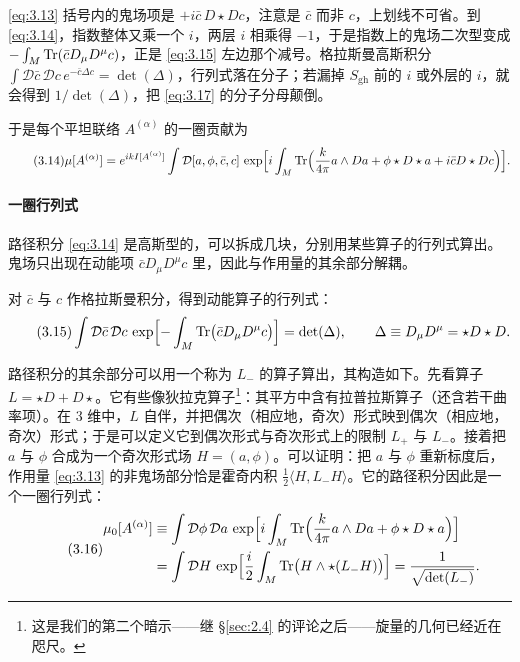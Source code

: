 \begin{yizhu}[易错点]
\eqref{eq:3.13} 括号内的鬼场项是 $+i\bar c\,D\star Dc$，注意是 $\bar c$ 而非 $c$，上划线不可省。到 \eqref{eq:3.14}，指数整体又乘一个 $i$，两层 $i$ 相乘得 $-1$，于是指数上的鬼场二次型变成 $-\int_M\operatorname{Tr}(\bar c D_\mu D^\mu c)$，正是 \eqref{eq:3.15} 左边那个减号。格拉斯曼高斯积分 $\int\mathcal{D}\bar c\,\mathcal{D}c\,e^{-\bar c\Delta c}=\det(\Delta)$，行列式落在分子；若漏掉 $S_{\mathrm{gh}}$ 前的 $i$ 或外层的 $i$，就会得到 $1/\det(\Delta)$，把 \eqref{eq:3.17} 的分子分母颠倒。
\end{yizhu}

于是每个平坦联络 $A^{(\alpha)}$ 的一圈贡献为
\begin{equation}\tag{3.14}\label{eq:3.14}
  \mu[A^{(\alpha)}] = e^{ikI[A^{(\alpha)}]}\int\mathcal{D}[a,\phi,\bar c,c]\,\exp\Bigl[i\int_M\operatorname{Tr}\Bigl(\frac{k}{4\pi}a\wedge Da + \phi\star D\star a + i\bar c D\star D c\Bigr)\Bigr].
\end{equation}

\paragraph{一圈行列式}
路径积分 \eqref{eq:3.14} 是高斯型的，可以拆成几块，分别用某些算子的行列式算出。鬼场只出现在动能项 $\bar c D_\mu D^\mu c$ 里，因此与作用量的其余部分解耦。

对 $\bar c$ 与 $c$ 作格拉斯曼积分，得到动能算子的行列式：
\begin{equation}\tag{3.15}\label{eq:3.15}
  \int\mathcal{D}\bar c\,\mathcal{D}c\,\exp\Bigl[-\int_M\operatorname{Tr}\bigl(\bar c D_\mu D^\mu c\bigr)\Bigr] = \det(\Delta),
  \qquad \Delta\equiv D_\mu D^\mu = \star D\star D.
\end{equation}

路径积分的其余部分可以用一个称为 $L_-$ 的算子算出，其构造如下。先看算子 $L=\star D+D\star$。它有些像狄拉克算子\footnote{这是我们的第二个暗示——继 \S\ref{sec:2.4} 的评论之后——旋量的几何已经近在咫尺。}：其平方中含有拉普拉斯算子（还含若干曲率项）。在 3 维中，$L$ 自伴，并把偶次（相应地，奇次）形式映到偶次（相应地，奇次）形式；于是可以定义它到偶次形式与奇次形式上的限制 $L_+$ 与 $L_-$。接着把 $a$ 与 $\phi$ 合成为一个奇次形式场 $H=(a,\phi)$。可以证明：把 $a$ 与 $\phi$ 重新标度后，作用量 \eqref{eq:3.13} 的非鬼场部分恰是霍奇内积 $\frac12\langle H,L_-H\rangle$。它的路径积分因此是一个一圈行列式：
\begin{equation}\tag{3.16}\label{eq:3.16}
\begin{aligned}
  \mu_0[A^{(\alpha)}] &\equiv \int\mathcal{D}\phi\,\mathcal{D}a\,\exp\Bigl[i\int_M\operatorname{Tr}\Bigl(\frac{k}{4\pi}a\wedge Da + \phi\star D\star a\Bigr)\Bigr]\\
  &= \int\mathcal{D}H\,\exp\Bigl[\frac{i}{2}\int_M\operatorname{Tr}\bigl(H\wedge\star(L_-H)\bigr)\Bigr]
  = \frac{1}{\sqrt{\det(L_-)}}.
\end{aligned}
\end{equation}

